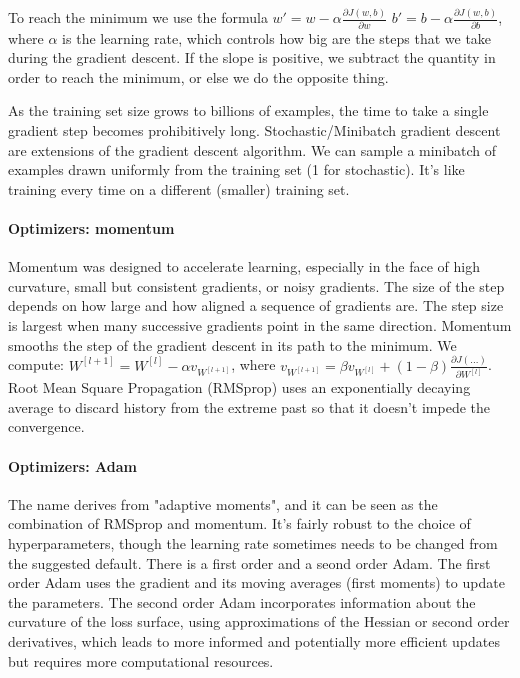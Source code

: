 \documentclass{article}
\begin{document}
To reach the minimum we use the formula $w' = w - \alpha \frac{\partial J(w,b)}{\partial w} \,\, b' = b - \alpha \frac{\partial J(w,b)}{\partial b}$, where $\alpha$ is the learning rate, which controls how big are the steps that we take during the gradient descent.
If the slope is positive, we subtract the quantity in order to reach the minimum, or else we do the opposite thing.

As the training set size grows to billions of examples, the time to take a single gradient step becomes prohibitively long.
Stochastic/Minibatch gradient descent are extensions of the gradient descent algorithm. We can sample a minibatch of examples drawn uniformly from the training set (1 for stochastic).
It's like training every time on a different (smaller) training set.

\paragraph{Optimizers: momentum}
Momentum was designed to accelerate learning, especially in the face of high curvature, small but consistent gradients, or noisy gradients.
The size of the step depends on how large and how aligned a sequence of gradients are.
The step size is largest when many successive gradients point in the same direction.
Momentum smooths the step of the gradient descent in its path to the minimum.
We compute: $W^{[l+1]} = W^{[l]} - \alpha v_{W^{[l + 1]}}$, where $v_{W^{[l + 1]}} = \beta v_{W^{[l]}} + (1-\beta) \frac{\partial J(...)}{\partial W^{[l]}}$.
Root Mean Square Propagation (RMSprop) uses an exponentially decaying average to discard history from the extreme past so that it doesn't impede the convergence.

\paragraph{Optimizers: Adam}
The name derives from "adaptive moments", and it can be seen as the combination of RMSprop and momentum.
It's fairly robust to the choice of hyperparameters, though the learning rate sometimes needs to be changed from the suggested default.
There is a first order and a seond order Adam.
The first order Adam uses the gradient and its moving averages (first moments) to update the parameters.
The second order Adam incorporates information about the curvature of the loss surface, using approximations of the Hessian or second order derivatives, which leads to more informed and potentially more efficient updates but requires more computational resources.
\end{document}
